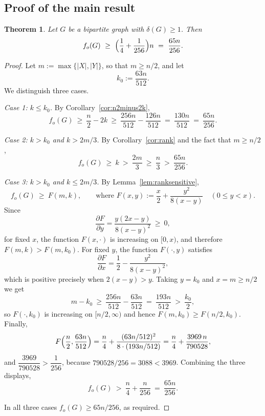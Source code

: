 \documentclass[11pt]{article}
\newtheorem{theorem}{Theorem}
\theoremstyle{definition}
\theoremstyle{remark}
\newcommand{\fo}{f_o}
\newcommand{\1}{\mathbf{1}}
\begin{document}
	\subsection{Proof of the main result}
	
	\begin{theorem}\label{thm:quarterplus}
		Let $G$ be a bipartite graph with $\delta(G)\ge1$. Then
		\[
		\fo(G)\ \ge\ \Bigl(\frac14+\frac1{256}\Bigr)n\ =\ \frac{65n}{256}.
		\]
	\end{theorem}
	
	\begin{proof}
		Let $m:=\max\{|X|,|Y|\}$, so that $m\ge n/2$, and let
		\[
		k_0:=\frac{63n}{512} .
		\]
		We distinguish three cases.
		
		\medskip\noindent\emph{Case 1: $k\le k_0$.} By Corollary~\ref{cor:n2minus2k},
		\[
		\fo(G)\ \ge\ \frac n2-2k\ \ge\ \frac{256n}{512}-\frac{126n}{512}\ =\ \frac{130n}{512}\ =\ \frac{65n}{256} .
		\]
		
		\medskip\noindent\emph{Case 2: $k>k_0$ and $k>2m/3$.} By Corollary~\ref{cor:rank} and the fact that $m\ge n/2$,
		\[
		\fo(G)\ \ge\ k\ >\ \frac{2m}{3}\ \ge\ \frac n3\ >\ \frac{65n}{256}.
		\]
		
		\medskip\noindent\emph{Case 3: $k>k_0$ and $k\le 2m/3$.} By Lemma~\ref{lem:ranksensitive},
		\[
		\fo(G)\ \ge\ F(m,k),\qquad\text{where } F(x,y):=\frac x2+\frac{y^{2}}{8(x-y)} \quad (0\le y<x).
		\]
		Since
		\[
		\frac{\partial F}{\partial y}=\frac{y(2x-y)}{8(x-y)^{2}}\ \ge\ 0,
		\]
		for fixed $x$, the function $F(x,\cdot)$ is increasing on $[0,x)$, and therefore $F(m,k)>F(m,k_0)$. For fixed $y$, the function $F(\cdot,y)$ satisfies
		\[
		\frac{\partial F}{\partial x}=\frac12-\frac{y^{2}}{8(x-y)^{2}} ,
		\]
		which is positive precisely when $2(x-y)>y$. Taking $y=k_0$ and $x=m\ge n/2$ we get
		\[
		m-k_0\ \ge\ \frac{256n}{512}-\frac{63n}{512}\ =\ \frac{193n}{512}\ >\ \frac{k_0}{2} ,
		\]
		so $F(\cdot,k_0)$ is increasing on $[n/2,\infty)$ and hence $F(m,k_0)\ge F(n/2,k_0)$. Finally,
		\[
		F\Bigl(\frac n2,\frac{63n}{512}\Bigr)
		=\frac n4+\frac{(63n/512)^{2}}{8\cdot(193n/512)}
		=\frac n4+\frac{3969\,n}{790528} ,
		\]
		and $\dfrac{3969}{790528}>\dfrac1{256}$, because $790528/256=3088<3969$. Combining the three displays,
		\[
		\fo(G)\ >\ \frac n4+\frac{n}{256}\ =\ \frac{65n}{256} .
		\]
		
		\medskip
		In all three cases $\fo(G)\ge 65n/256$, as required.
	\end{proof}
	
	
	
\end{document}
